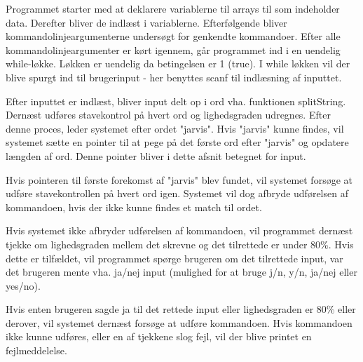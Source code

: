 Programmet starter med at deklarere variablerne til arrays til som indeholder data. Derefter bliver de indlæst i variablerne. Efterfølgende bliver kommandolinjeargumenterne undersøgt for genkendte kommandoer. Efter alle kommandolinjeargumenter er kørt igennem, går programmet ind i en uendelig while-løkke. Løkken er uendelig da betingelsen er 1 (true). I while løkken vil der blive spurgt ind til brugerinput - her benyttes scanf til indlæsning af inputtet.


Efter inputtet er indlæst, bliver input delt op i ord vha. funktionen splitString. Dernæst udføres stavekontrol på hvert ord og lighedsgraden udregnes. Efter denne proces, leder systemet efter ordet "jarvis". Hvis "jarvis" kunne findes, vil systemet sætte en pointer til at pege på det første ord efter "jarvis" og opdatere længden af ord. Denne pointer bliver i dette afsnit betegnet for input.


Hvis pointeren til første forekomst af "jarvis" blev fundet, vil systemet forsøge at udføre stavekontrollen på hvert ord igen. Systemet vil dog afbryde udførelsen af kommandoen, hvis der ikke kunne findes et match til ordet.


Hvis systemet ikke afbryder udførelsen af kommandoen, vil programmet dernæst tjekke om lighedsgraden mellem det skrevne og det tilrettede er under 80\%. Hvis dette er tilfældet, vil programmet spørge brugeren om det tilrettede input, var det brugeren mente vha. ja/nej input (mulighed for at bruge j/n, y/n, ja/nej eller yes/no).


Hvis enten brugeren sagde ja til det rettede input eller lighedsgraden er 80\% eller derover, vil systemet dernæst forsøge at udføre kommandoen. Hvis kommandoen ikke kunne udføres, eller en af tjekkene slog fejl, vil der blive printet en fejlmeddelelse.


